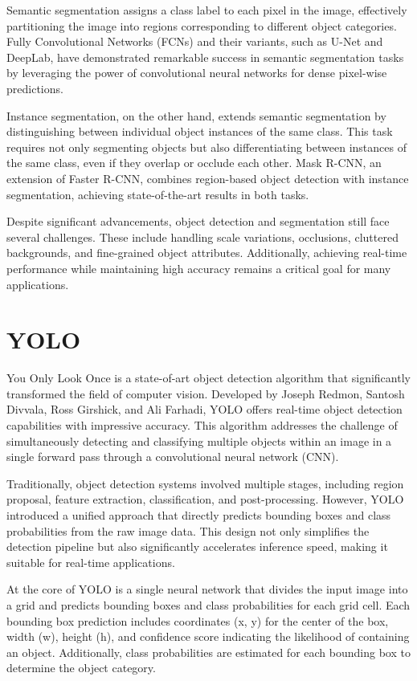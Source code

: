 Semantic segmentation assigns a class label to each pixel in the image, effectively partitioning the image into regions corresponding to different object categories. Fully Convolutional Networks (FCNs) and their variants, such as U-Net and DeepLab, have demonstrated remarkable success in semantic segmentation tasks by leveraging the power of convolutional neural networks for dense pixel-wise predictions.

Instance segmentation, on the other hand, extends semantic segmentation by distinguishing between individual object instances of the same class. This task requires not only segmenting objects but also differentiating between instances of the same class, even if they overlap or occlude each other. Mask R-CNN, an extension of Faster R-CNN, combines region-based object detection with instance segmentation, achieving state-of-the-art results in both tasks.

Despite significant advancements, object detection and segmentation still face several challenges. These include handling scale variations, occlusions, cluttered backgrounds, and fine-grained object attributes. Additionally, achieving real-time performance while maintaining high accuracy remains a critical goal for many applications.



\section{YOLO}
You Only Look Once is a state-of-art object detection algorithm that significantly transformed the field of
computer vision. Developed by Joseph Redmon, Santosh Divvala, Ross Girshick, and Ali Farhadi, YOLO offers real-time object detection capabilities with impressive accuracy. This algorithm addresses the challenge of simultaneously detecting and classifying multiple objects within an image in a single forward pass through a convolutional neural network (CNN).

Traditionally, object detection systems involved multiple stages, including region proposal, feature extraction, classification, and post-processing. However, YOLO introduced a unified approach that directly predicts bounding boxes and class probabilities from the raw image data. This design not only simplifies the detection pipeline but also significantly accelerates inference speed, making it suitable for real-time applications.

At the core of YOLO is a single neural network that divides the input image into a grid and predicts bounding boxes and class probabilities for each grid cell. Each bounding box prediction includes coordinates (x, y) for the center of the box, width (w), height (h), and confidence score indicating the likelihood of containing an object. Additionally, class probabilities are estimated for each bounding box to determine the object category.


